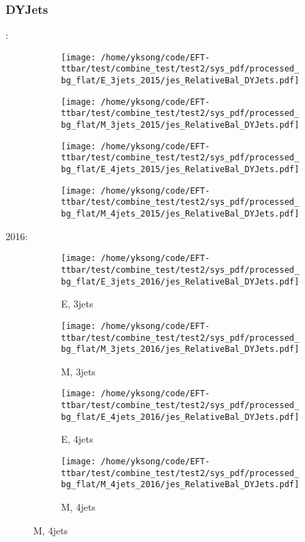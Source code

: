 \documentclass{beamer}
\begin{document}
\begin{frame}
\frametitle{DYJets}
\fontsize{5}{1}:
\begin{figure}
\centering
\begin{subfigure}[b]{0.24\textwidth}
\texttt{[image: /home/yksong/code/EFT-ttbar/test/combine\_test/test2/sys\_pdf/processed\_bg\_flat/E\_3jets\_2015/jes\_RelativeBal\_DYJets.pdf]}
\end{subfigure}
\begin{subfigure}[b]{0.24\textwidth}
\texttt{[image: /home/yksong/code/EFT-ttbar/test/combine\_test/test2/sys\_pdf/processed\_bg\_flat/M\_3jets\_2015/jes\_RelativeBal\_DYJets.pdf]}
\end{subfigure}
\begin{subfigure}[b]{0.24\textwidth}
\texttt{[image: /home/yksong/code/EFT-ttbar/test/combine\_test/test2/sys\_pdf/processed\_bg\_flat/E\_4jets\_2015/jes\_RelativeBal\_DYJets.pdf]}
\end{subfigure}
\begin{subfigure}[b]{0.24\textwidth}
\texttt{[image: /home/yksong/code/EFT-ttbar/test/combine\_test/test2/sys\_pdf/processed\_bg\_flat/M\_4jets\_2015/jes\_RelativeBal\_DYJets.pdf]}
\end{subfigure}
\end{figure}
2016:
\begin{figure}
\centering
\begin{subfigure}[b]{0.24\textwidth}
\texttt{[image: /home/yksong/code/EFT-ttbar/test/combine\_test/test2/sys\_pdf/processed\_bg\_flat/E\_3jets\_2016/jes\_RelativeBal\_DYJets.pdf]}
\captionsetup{font=tiny}
\caption{E, 3jets}
\end{subfigure}
\begin{subfigure}[b]{0.24\textwidth}
\texttt{[image: /home/yksong/code/EFT-ttbar/test/combine\_test/test2/sys\_pdf/processed\_bg\_flat/M\_3jets\_2016/jes\_RelativeBal\_DYJets.pdf]}
\captionsetup{font=tiny}
\caption{M, 3jets}
\end{subfigure}
\begin{subfigure}[b]{0.24\textwidth}
\texttt{[image: /home/yksong/code/EFT-ttbar/test/combine\_test/test2/sys\_pdf/processed\_bg\_flat/E\_4jets\_2016/jes\_RelativeBal\_DYJets.pdf]}
\captionsetup{font=tiny}
\caption{E, 4jets}
\end{subfigure}
\begin{subfigure}[b]{0.24\textwidth}
\texttt{[image: /home/yksong/code/EFT-ttbar/test/combine\_test/test2/sys\_pdf/processed\_bg\_flat/M\_4jets\_2016/jes\_RelativeBal\_DYJets.pdf]}
\captionsetup{font=tiny}
\caption{M, 4jets}
\end{subfigure}
\end{figure}
\end{frame}
\end{document}
